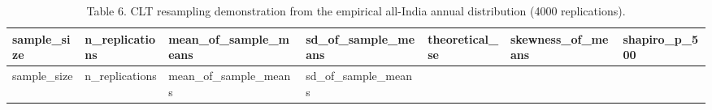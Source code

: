 \documentclass[
]{article}
\begin{document}
\begin{longtable}[]{@{}
  >{\raggedleft\arraybackslash}p{}
  >{\raggedleft\arraybackslash}p{}
  >{\raggedleft\arraybackslash}p{}
  >{\raggedleft\arraybackslash}p{}
  >{\raggedleft\arraybackslash}p{}
  >{\raggedleft\arraybackslash}p{}
  >{\raggedleft\arraybackslash}p{}@{}}
\caption{Table 6. CLT resampling demonstration from the empirical
all-India annual distribution (4000 replications).}\tabularnewline
\toprule\noalign{}
\begin{minipage}[b]{\linewidth}\raggedleft
sample\_size
\end{minipage} & \begin{minipage}[b]{\linewidth}\raggedleft
n\_replications
\end{minipage} & \begin{minipage}[b]{\linewidth}\raggedleft
mean\_of\_sample\_means
\end{minipage} & \begin{minipage}[b]{\linewidth}\raggedleft
sd\_of\_sample\_means
\end{minipage} & \begin{minipage}[b]{\linewidth}\raggedleft
theoretical\_se
\end{minipage} & \begin{minipage}[b]{\linewidth}\raggedleft
skewness\_of\_means
\end{minipage} & \begin{minipage}[b]{\linewidth}\raggedleft
shapiro\_p\_500
\end{minipage} \\
\midrule\noalign{}
\endfirsthead
\toprule\noalign{}
\begin{minipage}[b]{\linewidth}\raggedleft
sample\_size
\end{minipage} & \begin{minipage}[b]{\linewidth}\raggedleft
n\_replications
\end{minipage} & \begin{minipage}[b]{\linewidth}\raggedleft
mean\_of\_sample\_means
\end{minipage} & \begin{minipage}[b]{\linewidth}\raggedleft
sd\_of\_sample\_means
\end{minipage} & \begin{minipage}[b]{\linewidth}\raggedleft

\end{minipage}
\end{longtable}
\end{document}
